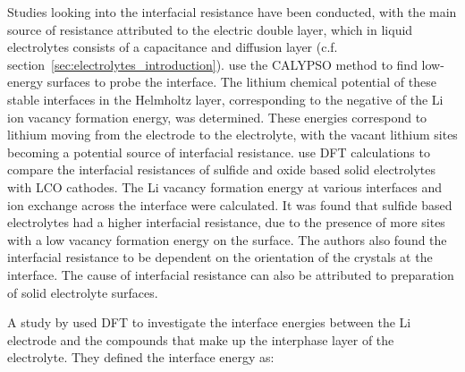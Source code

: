 \documentclass[../main.tex]{subfiles}
\begin{document}
Studies looking into the interfacial resistance have been conducted,\cite{Tateyama2019, Okuno2020, Sharafi2017, Jiang2019} with the main source of resistance attributed to the electric double layer, which in liquid electrolytes consists of a capacitance and diffusion layer (c.f. section~\ref{sec:electrolytes_introduction}).\cite{Tateyama2019} %
\citeauthor{Tateyama2019} use the CALYPSO method to find low-energy surfaces\cite{Gao2019} to probe the interface. The lithium chemical potential of these stable interfaces in the Helmholtz layer, corresponding to the negative of the Li ion vacancy formation energy, was determined. These energies correspond to lithium moving from the electrode to the electrolyte, with the vacant lithium sites becoming a potential source of interfacial resistance. \citeauthor{Okuno2020} use DFT calculations to compare the interfacial resistances of sulfide and oxide based solid electrolytes with LCO cathodes.\cite{Okuno2020} The Li vacancy formation energy at various interfaces and ion exchange across the interface were calculated. It was found that sulfide based electrolytes had a higher interfacial resistance, due to the presence of more sites with a low vacancy formation energy on the surface. The authors also found the interfacial resistance to be dependent on the orientation of the crystals at the interface. The cause of interfacial resistance can also be attributed to preparation of solid electrolyte surfaces.


A study by \citeauthor{Lepley2015} used DFT to investigate the interface energies between the Li electrode and the compounds that make up the interphase layer of the electrolyte.\cite{Lepley2015} They defined the interface energy as:
\end{document}

